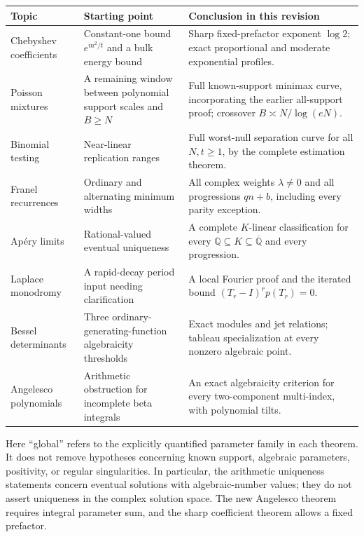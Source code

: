 \documentclass[11pt,a4paper]{article}
\theoremstyle{definition}
\theoremstyle{remark}
\numberwithin{equation}{section}
\begin{document}
\begin{center}\small
\begin{tabular}{@{}>{\raggedright\arraybackslash}p{}>{\raggedright\arraybackslash}p{}>{\raggedright\arraybackslash}p{}@{}}
\toprule
Topic & Starting point & Conclusion in this revision\\
\midrule
Chebyshev coefficients & Constant-one bound $e^{m^2/t}$ and a bulk energy bound & Sharp fixed-prefactor exponent $\log2$; exact proportional and moderate exponential profiles.\\[4pt]
Poisson mixtures & A remaining window between polynomial support scales and $B\ge N$ & Full known-support minimax curve, incorporating the earlier all-support proof; crossover $B\asymp N/\log(eN)$.\\[4pt]
Binomial testing & Near-linear replication ranges & Full worst-null separation curve for all $N,t\ge1$, by the complete estimation theorem.\\[4pt]
Franel recurrences & Ordinary and alternating minimum widths & All complex weights $\lambda\ne0$ and all progressions $qn+b$, including every parity exception.\\[4pt]
Ap\'ery limits & Rational-valued eventual uniqueness & A complete $K$-linear classification for every $\mathbb Q\subseteq K\subseteq\overline{\mathbb Q}$ and every progression.\\[4pt]
Laplace monodromy & A rapid-decay period input needing clarification & A local Fourier proof and the iterated bound $(T_r-I)^rp(T_r)=0$.\\[4pt]
Bessel determinants & Three ordinary-generating-function algebraicity thresholds & Exact modules and jet relations; tableau specialization at every nonzero algebraic point.\\[4pt]
Angelesco polynomials & Arithmetic obstruction for incomplete beta integrals & An exact algebraicity criterion for every two-component multi-index, with polynomial tilts.\\
\bottomrule
\end{tabular}
\end{center}

Here ``global'' refers to the explicitly quantified parameter family in
each theorem. It does not remove hypotheses concerning known support,
algebraic parameters, positivity, or regular singularities. In particular,
the arithmetic uniqueness statements concern eventual solutions with
algebraic-number values; they do not assert uniqueness in the complex
solution space. The new Angelesco theorem requires integral parameter
sum, and the sharp coefficient theorem allows a fixed prefactor.
\end{document}
